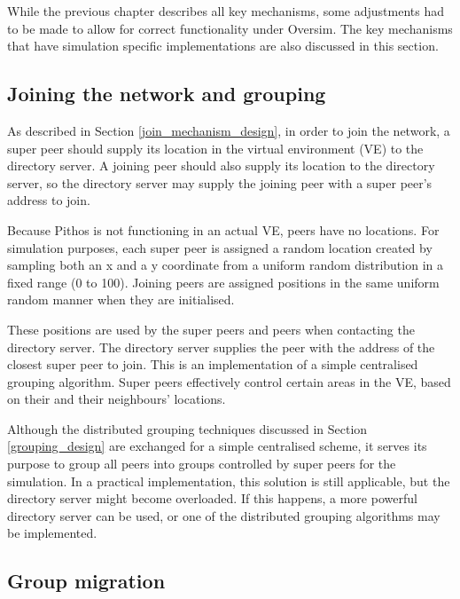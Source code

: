 
While the previous chapter describes all key mechanisms, some adjustments had to be made to allow for correct functionality under Oversim. The key mechanisms that have simulation specific implementations are also discussed in this section.

\subsection{Joining the network and grouping}
\label{joining_and_grouping_imp}

As described in Section \ref{join_mechanism_design}, in order to join the network, a super peer should supply its location in the virtual environment (VE) to the directory server. A joining peer should also supply its location to the directory server, so the directory server may supply the joining peer with a super peer's address to join.

Because Pithos is not functioning in an actual VE, peers have no locations. For simulation purposes, each super peer is assigned a random location created by sampling both an x and a y coordinate from a uniform random distribution in a fixed range (0 to 100). Joining peers are assigned positions in the same uniform random manner when they are initialised.

These positions are used by the super peers and peers when contacting the directory server. The directory server supplies the peer with the address of the closest super peer to join. This is an implementation of a simple centralised grouping algorithm. Super peers effectively control certain areas in the VE, based on their and their neighbours' locations.

Although the distributed grouping techniques discussed in Section \ref{grouping_design} are exchanged for a simple centralised scheme, it serves its purpose to group all peers into groups controlled by super peers for the simulation. In a practical implementation, this solution is still applicable, but the directory server might become overloaded. If this happens, a more powerful directory server can be used, or one of the distributed grouping algorithms may be implemented.

\subsection{Group migration}
\label{group_migration_implementation}

